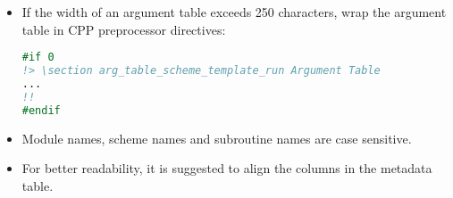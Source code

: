 \begin{itemize}
\item If the width of an argument table exceeds 250 characters, wrap the argument table in CPP preprocessor directives:
\begin{lstlisting}[language=Fortran]
#if 0
!> \section arg_table_scheme_template_run Argument Table
...
!!
#endif
\end{lstlisting}
\item Module names, scheme names and subroutine names are case sensitive.
\item For better readability, it is suggested to align the columns in the metadata table.
\end{itemize}

